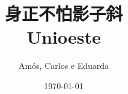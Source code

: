 \documentclass[11pt, a4paper, twoside]{article}
\title{身正不怕影子斜 \\ Unioeste}
\author{Amós, Carlos e Eduarda}
\begin{document}
\twocolumn
\date{\today}
\maketitle


\renewcommand{\contentsname}{Índice} %
\tableofcontents
\end{document}
